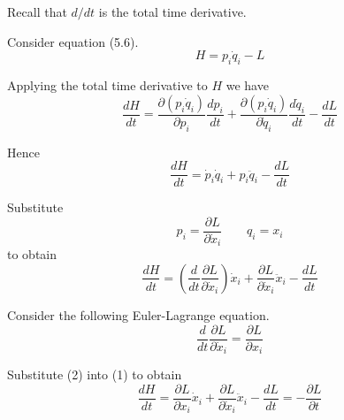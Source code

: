 


\bigskip
Recall that $d/dt$ is the total time derivative.

\bigskip
Consider equation (5.6).
\begin{equation*}
H=p_i\dot q_i-L
\tag{5.6}
\end{equation*}

Applying the total time derivative to $H$ we have
\begin{equation*}
\frac{dH}{dt}
=\frac{\partial(p_i\dot q_i)}{\partial p_i}\frac{dp_i}{dt}
+\frac{\partial(p_i\dot q_i)}{\partial\dot q_i}\frac{d\dot q_i}{dt}
-\frac{dL}{dt}
\end{equation*}

Hence
\begin{equation*}
\frac{dH}{dt}
=\dot p_i\dot q_i+p_i\ddot q_i
-\frac{dL}{dt}
\end{equation*}

Substitute
\begin{equation*}
p_i=\frac{\partial L}{\partial\dot x_i}
\qquad
q_i=x_i
\end{equation*}
to obtain
\begin{equation*}
\frac{dH}{dt}
=\left(\frac{d}{dt}\frac{\partial L}{\partial\dot x_i}\right)\dot x_i
+\frac{\partial L}{\partial\dot x_i}\ddot x_i
-\frac{dL}{dt}
\tag{1}
\end{equation*}

Consider the following Euler-Lagrange equation.
\begin{equation*}
\frac{d}{dt}\frac{\partial L}{\partial\dot x_i}=\frac{\partial L}{\partial x_i}
\tag{2}
\end{equation*}

Substitute (2) into (1) to obtain
\begin{equation*}
\frac{dH}{dt}
=\frac{\partial L}{\partial x_i}\dot x_i
+\frac{\partial L}{\partial\dot x_i}\ddot x_i
-\frac{dL}{dt}
=-\frac{\partial L}{\partial t}
\end{equation*}


